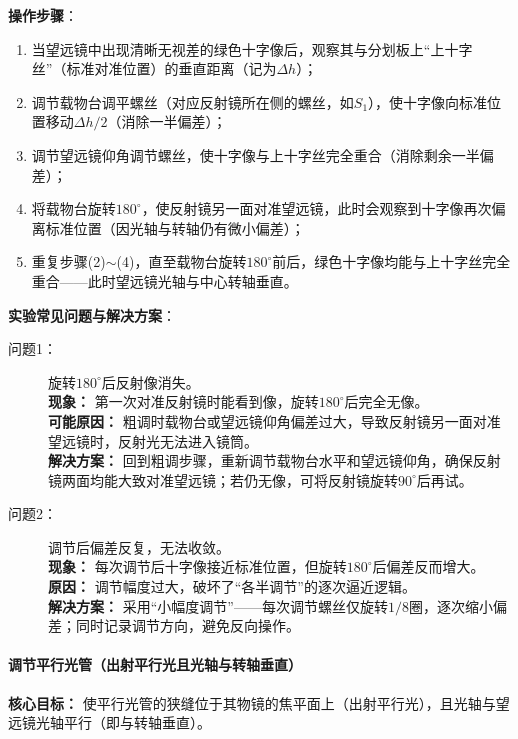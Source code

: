 \documentclass[11pt]{article}
\begin{document}
\textbf{操作步骤}：
\begin{enumerate}[label=(\arabic*), itemsep=0.5ex]
    \item 当望远镜中出现清晰无视差的绿色十字像后，观察其与分划板上“上十字丝”（标准对准位置）的垂直距离（记为$\Delta h$）；
    \item 调节载物台调平螺丝（对应反射镜所在侧的螺丝，如$S_1$），使十字像向标准位置移动$\Delta h/2$（消除一半偏差）；
    \item 调节望远镜仰角调节螺丝，使十字像与上十字丝完全重合（消除剩余一半偏差）；
    \item 将载物台旋转$180^\circ$，使反射镜另一面对准望远镜，此时会观察到十字像再次偏离标准位置（因光轴与转轴仍有微小偏差）；
    \item 重复步骤(2)$\sim$(4)，直至载物台旋转$180^\circ$前后，绿色十字像均能与上十字丝完全重合——此时望远镜光轴与中心转轴垂直。
\end{enumerate}

\textbf{实验常见问题与解决方案}：
\begin{description}
    \item[问题1：] 旋转$180^\circ$后反射像消失。\\
    \textbf{现象：} 第一次对准反射镜时能看到像，旋转$180^\circ$后完全无像。\\
    \textbf{可能原因：} 粗调时载物台或望远镜仰角偏差过大，导致反射镜另一面对准望远镜时，反射光无法进入镜筒。\\
    \textbf{解决方案：} 回到粗调步骤，重新调节载物台水平和望远镜仰角，确保反射镜两面均能大致对准望远镜；若仍无像，可将反射镜旋转$90^\circ$后再试。
    
    \item[问题2：] 调节后偏差反复，无法收敛。\\
    \textbf{现象：} 每次调节后十字像接近标准位置，但旋转$180^\circ$后偏差反而增大。\\
    \textbf{原因：} 调节幅度过大，破坏了“各半调节”的逐次逼近逻辑。\\
    \textbf{解决方案：} 采用“小幅度调节”——每次调节螺丝仅旋转$1/8$圈，逐次缩小偏差；同时记录调节方向，避免反向操作。
\end{description}

\paragraph{调节平行光管（出射平行光且光轴与转轴垂直）}
\textbf{核心目标：} 使平行光管的狭缝位于其物镜的焦平面上（出射平行光），且光轴与望远镜光轴平行（即与转轴垂直）。
\end{document}
